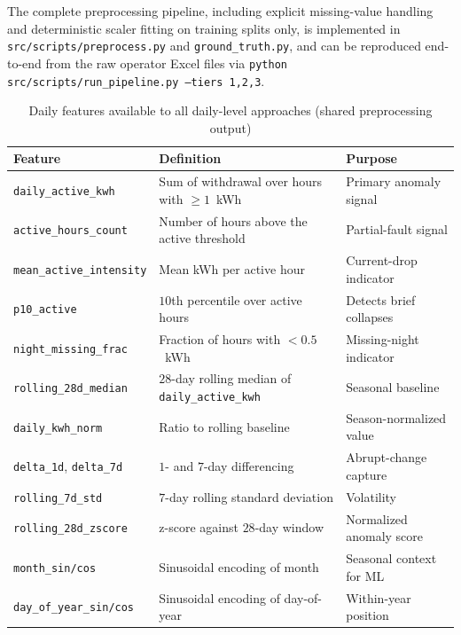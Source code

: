 \documentclass{article}
\begin{document}
The complete preprocessing pipeline, including explicit missing-value handling and deterministic scaler fitting on training splits only, is implemented in \texttt{src/scripts/preprocess.py} and \texttt{ground\_truth.py}, and can be reproduced end-to-end from the raw operator Excel files via \texttt{python src/scripts/run\_pipeline.py --tiers 1,2,3}.

\begin{table}[H]
\centering
\caption{Daily features available to all daily-level approaches (shared preprocessing output)}
\label{tab:daily_features}
\small
\begin{tabular}{p{3.3cm}p{5.5cm}p{5.2cm}}
\toprule
\textbf{Feature} & \textbf{Definition} & \textbf{Purpose}\\
\midrule
\texttt{daily\_active\_kwh}      & Sum of withdrawal over hours with $\geq 1$~kWh & Primary anomaly signal\\
\texttt{active\_hours\_count}    & Number of hours above the active threshold & Partial-fault signal\\
\texttt{mean\_active\_intensity} & Mean kWh per active hour & Current-drop indicator\\
\texttt{p10\_active}             & $10$th percentile over active hours & Detects brief collapses\\
\texttt{night\_missing\_frac}    & Fraction of hours with $<0.5$~kWh & Missing-night indicator\\
\texttt{rolling\_28d\_median}    & $28$-day rolling median of \texttt{daily\_active\_kwh} & Seasonal baseline\\
\texttt{daily\_kwh\_norm}        & Ratio to rolling baseline & Season-normalized value\\
\texttt{delta\_1d}, \texttt{delta\_7d} & $1$- and $7$-day differencing & Abrupt-change capture\\
\texttt{rolling\_7d\_std}        & $7$-day rolling standard deviation & Volatility\\
\texttt{rolling\_28d\_zscore}    & z-score against $28$-day window & Normalized anomaly score\\
\texttt{month\_sin/cos}          & Sinusoidal encoding of month & Seasonal context for ML\\
\texttt{day\_of\_year\_sin/cos}  & Sinusoidal encoding of day-of-year & Within-year position\\
\bottomrule
\end{tabular}
\end{table}
\end{document}
